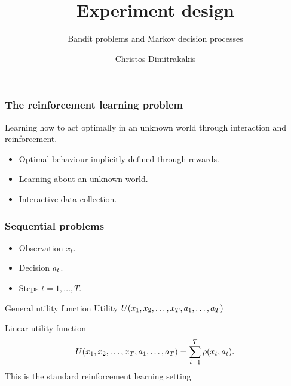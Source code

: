 \documentclass[9pt]{beamer}
\title{Experiment design}
\subtitle{Bandit problems and Markov decision processes}
\author{Christos Dimitrakakis}
\institute{UiO}
\begin{document}
\begin{frame}
  \titlepage
\end{frame}

\begin{frame}
  \tableofcontents
\end{frame}

\begin{frame}
  \frametitle{The reinforcement learning problem}
  \alert{Learning} how to \alert{act optimally} in an \alert{unknown world} through \alert{interaction} and \alert{reinforcement}.

  \begin{itemize}
  \item Optimal behaviour implicitly defined through rewards.
  \item Learning about an unknown world.
  \item Interactive data collection.
  \end{itemize}
\end{frame}


\begin{frame}
  \frametitle{Sequential problems}
  \begin{itemize}
  \item Observation $x_t$.
  \item Decision $a_t$.
  \item Steps $t = 1, \ldots, T$.
  \end{itemize}

  \begin{block}{General utility function}
    Utility $U(x_1, x_2, \ldots, x_T, a_1, \ldots, a_T)$
  \end{block}

  \begin{block}{Linear utility function}
    \[
      U(x_1, x_2, \ldots, x_T, a_1, \ldots, a_T)
      = 
      \sum_{t=1}^T \rho(x_t, a_t).
    \]
    \alert{This is the standard reinforcement learning setting}
  \end{block}
\end{frame}
\end{document}
